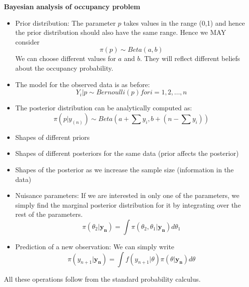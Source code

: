 \documentclass[10pt]{beamer}
\begin{document}
\begin{frame}
\begin{center}
\large \textbf {Bayesian analysis of occupancy problem}
\end{center}
\begin{itemize}
\item Prior distribution: The parameter $p$ takes values in the range (0,1) and hence the prior distribution should also have the same range. Hence we MAY consider 
\begin{equation}
\pi(p)\sim Beta(a,b)
\end{equation}
We can choose different values for $a$ and $b$. They will reflect different beliefs about the occupancy probability. 
\item The model for the observed data is as before:
\begin{equation}
Y_{i}|p\sim Bernoulli(p) for i=1,2,...,n
\end{equation}
\item The posterior distribution can be analytically computed as:
\begin{equation}
\pi(p|y_{(n)})\sim Beta(a+\sum y_{i},b+(n-\sum y_{i}))
\end{equation}
\end{itemize}
\end{frame}

\begin{frame}
\begin{itemize}
\item Shapes of different priors
\pause
\item Shapes of different posteriors for the same data (prior affects the posterior)
\pause
\item Shapes of the posterior as we increase the sample size (information in the data)
\end{itemize}
\end{frame}


\begin{frame}
\begin{itemize}
\item Nuisance parameters: If we are interested in only one of the parameters, we simply find the marginal posterior distribution for it by integrating over the rest of the parameters. 
\begin{equation}
\pi(\theta_2|\mathbf{y_n})=\int \pi(\theta_2,\theta_1|\mathbf{y_n})d\theta_1
\end{equation}
\pause
\item Prediction of a new observation: We can simply write 
\begin{equation}
\pi(y_{n+1}|\mathbf{y_n})=\int f(y_{n+1}|\theta)\pi(\theta|\mathbf{y_n})d\theta
\end{equation}
\end{itemize}
All these operations follow from the standard probability calculus. 
\end{frame}
\end{document}
